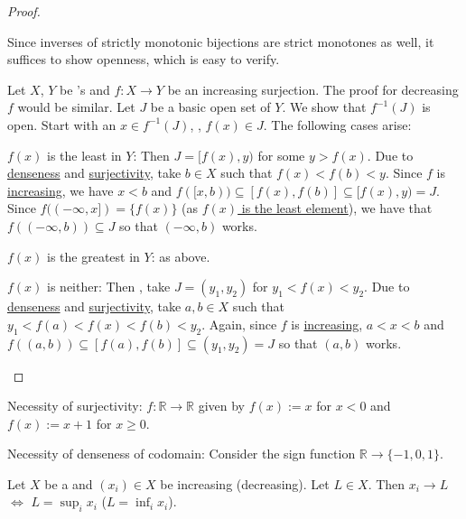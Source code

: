 	\begin{proof}
		\begin{mylist}
			\item Since inverses of strictly monotonic bijections are strict monotones as well, it suffices to show openness, which is easy to verify.
			
			\item Let $X$, $Y$ be \LOTS's and $f\colon X\to Y$ be an increasing surjection. The proof for decreasing $f$ would be similar. Let $J$ be a basic open set of $Y$. We show that $f^{-1}(J)$ is open. Start with an $x\in f^{-1}(J)$, \ie, $f(x)\in J$. The following cases arise:
			\begin{mylist}
				\item $f(x)$ is the least in $Y$: Then $J = [f(x), y)$ for some $y > f(x)$. Due to \uline{denseness} and \uline{surjectivity}, take $b\in X$ such that $f(x) < f(b) < y$. Since $f$ is \uline{increasing}, we have $x < b$ and $f([x, b))\subseteq [f(x), f(b)] \subseteq [f(x), y) = J$. Since $f((-\infty, x]) = \{f(x)\}$ (as \uline{$f(x)$ is the least element}), we have that $f((-\infty, b))\subseteq J$ so that $(-\infty, b)$ works.
				
				\item $f(x)$ is the greatest in $Y$: \Lly as above.
				
				\item $f(x)$ is neither: Then \wlogg, take $J = (y_1, y_2)$ for $y_1 < f(x) < y_2$. Due to \uline{denseness} and \uline{surjectivity}, take $a, b\in X$ such that $y_1 < f(a) < f(x) < f(b) < y_2$. Again, since $f$ is \uline{increasing}, $a < x < b$ and $f((a, b))\subseteq [f(a), f(b)]\subseteq (y_1, y_2) = J$ so that $(a, b)$ works.
				\qedhere
			\end{mylist}
		\end{mylist}
	\end{proof}
	
	\begin{rmk}
		\begin{mylist}
			\item Necessity of surjectivity: $f\colon \mathbb{R\to R}$ given by $f(x) := x$ for $x < 0$ and $f(x) := x + 1$ for $x\ge 0$.
			
			\item Necessity of denseness of codomain: Consider the sign function $\mathbb R\to \{-1, 0, 1\}$.
		\end{mylist}
	\end{rmk}
	
	
	\begin{prp}\label{PRP: monotone convg}
		Let $X$ be a \LOTS and $(x_i)\in X$ be increasing (\resp decreasing). Let $L\in X$. Then $x_i\to L$ $\iff$ $L = \sup_i x_i$ (\resp $L = \inf_i x_i$).
	\end{prp}
	
